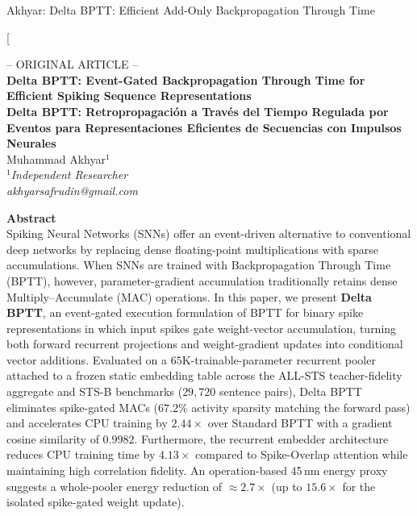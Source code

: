 \documentclass[10pt,journal,compsoc]{IEEEtran}
\DeclareRobustCommand{\orcidicon}[1]{\href{https://orcid.org/#1}{\mbox{\scalebox{0.75}{\tikz[baseline=-0.4ex]{
  \fill[orcidlogocolor] (0,0) circle (0.52em);
  \node[color=white,font=\sffamily\bfseries] at (0,0) {\fontsize{4.5pt}{4.5pt}\selectfont iD};
}}}}}
\begin{document}
%
{Akhyar: Delta BPTT: Efficient Add-Only Backpropagation Through Time}

\twocolumn[{%
  \begin{center}
    {\small -- ORIGINAL ARTICLE --} \\[0.8em]

    {\Huge\bfseries Delta BPTT: Event-Gated Backpropagation Through Time for Efficient Spiking Sequence Representations} \\[0.6em]

    {\large\bfseries Delta BPTT: Retropropagación a Través del Tiempo Regulada por Eventos para Representaciones Eficientes de Secuencias con Impulsos Neurales} \\[1.0em]

    {\fontsize{11pt}{13pt}\selectfont Muhammad Akhyar$^{1}$\,\orcidicon{0009-0001-3259-4996}} \\[0.8em]

    {$^{1}$\emph{Independent Researcher}} \\
    \emph{akhyarsafrudin@gmail.com} \\[1.2em]
  \end{center}

  \noindent
  \begin{minipage}[t]{0.48\linewidth}
    {\large\bfseries Abstract}\\[0.4em]
    {\fontsize{8.5pt}{10.2pt}\selectfont Spiking Neural Networks (SNNs) offer an event-driven alternative to conventional deep networks by replacing dense floating-point multiplications with sparse accumulations. When SNNs are trained with Backpropagation Through Time (BPTT), however, parameter-gradient accumulation traditionally retains dense Multiply--Accumulate (MAC) operations. In this paper, we present \textbf{Delta BPTT}, an event-gated execution formulation of BPTT for binary spike representations in which input spikes gate weight-vector accumulation, turning both forward recurrent projections and weight-gradient updates into conditional vector additions. Evaluated on a $65$K-trainable-parameter recurrent pooler attached to a frozen static embedding table across the ALL-STS teacher-fidelity aggregate and STS-B benchmarks ($29{,}720$ sentence pairs), Delta BPTT eliminates spike-gated MACs ($67.2\%$ activity sparsity matching the forward pass) and accelerates CPU training by $2.44\times$ over Standard BPTT with a gradient cosine similarity of $0.9982$. Furthermore, the recurrent embedder architecture reduces CPU training time by $4.13\times$ compared to Spike-Overlap attention while maintaining high correlation fidelity. An operation-based 45\,nm energy proxy suggests a whole-pooler energy reduction of $\approx 2.7\times$ (up to $15.6\times$ for the isolated spike-gated weight update).}


\end{minipage}}
\end{document}
